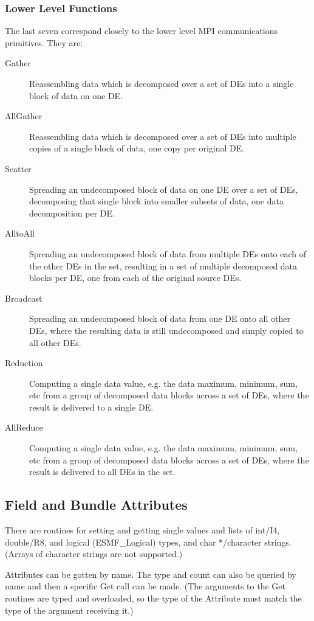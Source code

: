 \subsubsection{Lower Level Functions}
The last seven correspond closely to the lower level
MPI communications primitives.  They are:
\begin{description}
\item[Gather]
Reassembling data which is decomposed over a set of DEs into a single
block of data on one DE.
\item[AllGather]
Reassembling data which is decomposed over a set of DEs into multiple
copies of a single block of data, one copy per original DE.
\item[Scatter]
Spreading an undecomposed block of data on one DE over a set of DEs,
decomposing that single block into smaller subsets of data, one
data decomposition per DE.
\item[AlltoAll]
Spreading an undecomposed block of data from multiple DEs onto
each of the other DEs in the set, resulting in a set of multiple decomposed 
data blocks per DE, one from each of the original source DEs.
\item[Broadcast]
Spreading an undecomposed block of data from one DE onto all other
DEs, where the resulting data is still undecomposed and simply
copied to all other DEs.
\item[Reduction]
Computing a single data value, e.g. the data maximum, minimum, sum, etc
from a group of decomposed data blocks across a set of DEs, where the
result is delivered to a single DE.
\item[AllReduce]
Computing a single data value, e.g. the data maximum, minimum, sum, etc
from a group of decomposed data blocks across a set of DEs, where the
result is delivered to all DEs in the set.
\end{description}

\subsection{Field and Bundle Attributes}

There are routines for setting and getting single values and lists of
int/I4, double/R8, and logical (ESMF\_Logical) types, and char */character
strings.  (Arrays of character strings are not supported.)

Attributes can be gotten by name.  The type and count can also be queried
by name and then a specific Get call can be made.  (The arguments to the
Get routines are typed and overloaded, so the type of the Attribute must
match the type of the argument receiving it.)

